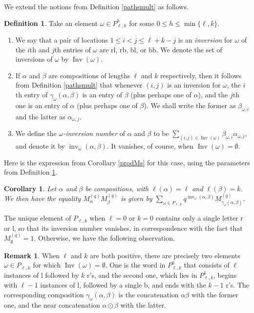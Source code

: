 \documentclass{article}
\newtheorem{cor}[thm]{Corollary}
\theoremstyle{definition}
\newtheorem{defn}[thm]{Definition}
\newtheorem{rmk}[thm]{Remark}
\begin{document}
We extend the notions from Definition \ref{pathsmult} as follows.
\begin{defn}
Take an element $\omega \in P_{\ell,k}^{h}$ for some $0 \leq h\leq\min\{\ell,k\}$.
\begin{enumerate}[$(i)$]
\item We say that a pair of locations $1 \leq i<j\leq\ell+k-j$ is an \emph{inversion} for $\omega$ of the $i$th and $j$th entries of $\omega$ are rl, rb, bl, or bb. We denote the set of inversions of $\omega$ by $\operatorname{Inv}(\omega)$.
\item If $\alpha$ and $\beta$ are compositions of lengths $\ell$ and $k$ respectively, then it follows from Definition \ref{pathsmult} that whenever $(i,j)$ is an inversion for $\omega$, the $i$th entry of $\gamma_{\omega}(\alpha,\beta)$ is an entry of $\beta$ (plus perhaps one of $\alpha$), and the $j$th one is an entry of $\alpha$ (plus perhaps one of $\beta$). We shall write the former as $\beta_{\omega,i}$ and the latter as $\alpha_{\omega,j}$.
\item We define the \emph{$\omega$-inversion number} of $\alpha$ and $\beta$ to be $\sum_{(i,j)\in\operatorname{Inv}(\omega)}\beta_{\omega,i}\alpha_{\omega,j}$, and denote it by $\operatorname{inv}_{\omega}(\alpha,\beta)$. It vanishes, of course, when $\operatorname{Inv}(\omega)=\emptyset$.
\end{enumerate} \label{pathsinv}
\end{defn}

Here is the expression from Corollary \ref{prodMs} for this case, using the parameters from Definition \ref{pathsinv}.
\begin{cor}
Let $\alpha$ and $\beta$ be compositions, with $\ell(\alpha)=\ell$ and $\ell(\beta)=k$. We then have the equality $M_{\alpha}^{(q)}M_{\beta}^{(q)}$ is given by $\sum_{\omega \in P_{\ell,k}}q^{\operatorname{inv}_{\omega}(\alpha,\beta)}M_{\gamma_{\omega}(\alpha,\beta)}^{(q)}$. \label{prodMqs}
\end{cor}
The unique element of $P_{\ell,k}$ when $\ell=0$ or $k=0$ contains only a single letter r or l, so that its inversion number vanishes, in correspondence with the fact that $M_{\emptyset}^{(q)}=1$. Otherwise, we have the following observation.
\begin{rmk}
When $\ell$ and $k$ are both positive, there are precisely two elements $\omega \in P_{\ell,k}$ for which $\operatorname{Inv}(\omega)=\emptyset$. One is the word in $P_{\ell,k}^{0}$ that consists of $\ell$ instances of l followed by $k$ r's, and the second one, which lies in $P_{\ell,k}^{1}$, begins with $\ell-1$ instances of l, followed by a single b, and ends with the $k-1$ r's. The corresponding composition $\gamma_{\omega}(\alpha,\beta)$ is the concatenation $\alpha\beta$ with the former one, and the near concatenation $\alpha\odot\beta$ with the latter. \label{invw0}
\end{rmk}
\end{document}
